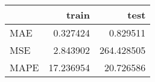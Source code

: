 \begin{tabular}{lrr}
\toprule
{} &      train &        test \\
\midrule
MAE  &   0.327424 &    0.829511 \\
MSE  &   2.843902 &  264.428505 \\
MAPE &  17.236954 &   20.726586 \\
\bottomrule
\end{tabular}
